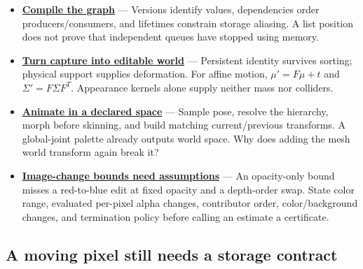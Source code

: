 \begin{itemize}
\item
  \textbf{\href{Game\%20Engine\%20-\%20From\%20First\%20Frame\%20to\%20Living\%20Worlds\#2.\%20Compile\%20a\%20render\%20graph\%20before\%20executing\%20it}{Compile the graph}} --- Versions identify values, dependencies order producers/consumers, and lifetimes constrain storage aliasing. A list position does not prove that independent queues have stopped using memory.
\item
  \textbf{\href{Game\%20Engine\%20-\%20From\%20First\%20Frame\%20to\%20Living\%20Worlds\#Rendering\%20identity\%20becomes\%20world\%20identity\%20only\%20through\%20an\%20explicit\%20bridge}{Turn capture into editable world}} --- Persistent identity survives sorting; physical support supplies deformation. For affine motion, \(\mu'=F\mu+t\) and \(\Sigma'=F\Sigma F^T\). Appearance kernels alone supply neither mass nor colliders.
\item
  \textbf{\href{University\%20-\%20Worlds,\%20Images\%20and\%20Inference\%20-\%20Graphics,\%20Vision\%20and\%20Photography\#5.\%20Build\%20a\%20pose\%20first,\%20then\%20deform\%20the\%20surface}{Animate in a declared space}} --- Sample pose, resolve the hierarchy, morph before skinning, and build matching current/previous transforms. A global-joint palette already outputs world space. Why does adding the mesh world transform again break it?
\item
  \textbf{\href{Game\%20Engine\%20-\%20From\%20First\%20Frame\%20to\%20Living\%20Worlds\#An\%20image-change\%20certificate\%20must\%20name\%20the\%20edits\%20it\%20covers}{Image-change bounds need assumptions}} --- An opacity-only bound misses a red-to-blue edit at fixed opacity and a depth-order swap. State color range, evaluated per-pixel alpha changes, contributor order, color/background changes, and termination policy before calling an estimate a certificate.
\end{itemize}

\subsection{A moving pixel still needs a storage contract}\label{a-moving-pixel-still-needs-a-storage-contract}

